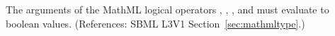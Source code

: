 The arguments of the MathML logical operators , ,
, and  must evaluate to boolean values.  (References:
SBML L3V1 Section~\ref{sec:mathmltype}.)
